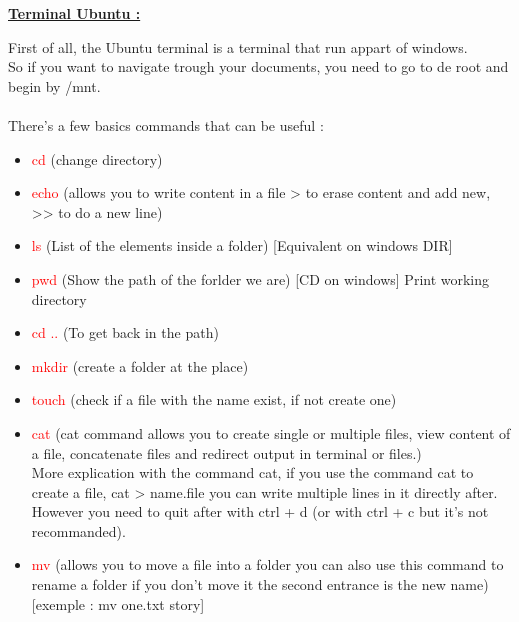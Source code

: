 \documentclass{article}
\begin{document}
\begin{center}
\LARGE{\bf \underline {Terminal Ubuntu :}} \\
\end{center}
First of all, the Ubuntu terminal is a terminal that run appart of windows.
\\ So if you want to navigate trough your documents, you need to go to de root and begin by /mnt. \\
\\ There's a few basics commands that can be useful : \\
\begin{itemize}
    \item \textcolor{red}{cd} (change directory) \\
    \item \textcolor{red}{echo} (allows you to write content in a file > to erase content and add new, >> to do a new line) \\
    \item \textcolor{red}{ls} (List of the elements inside a folder) [Equivalent on windows DIR] \\
    \item \textcolor{red}{pwd} (Show the path of the forlder we are) [CD on windows] Print working directory \\
    \item \textcolor{red}{cd ..} (To get back in the path) \\
    \item \textcolor{red}{mkdir} (create a folder at the place) \\
    \item \textcolor{red}{touch} (check if a file with the name exist, if not create one) \\
    \item \textcolor{red}{cat} (cat command allows you to create single or multiple files, view content of a file, concatenate files and redirect output in terminal or files.) \\
    More explication with the command cat, if you use the command cat to create a file, cat > name.file you can write multiple lines in it directly after. \\
    However you need to quit after with ctrl + d (or with ctrl + c but it's not recommanded). \\
    \item \textcolor{red}{mv} (allows you to move a file into a folder you can also use this command to rename a folder if you don't move it the second entrance is the new name) [exemple : mv one.txt story] \\

\end{itemize}
\end{document}
